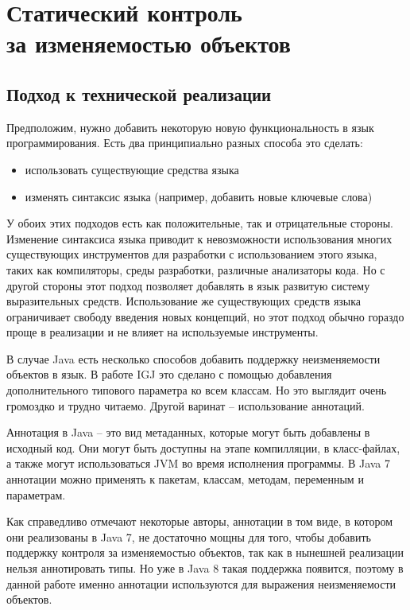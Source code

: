\chapter{Статический контроль \\ за изменяемостью объектов}

\section{Подход к технической реализации}

Предположим, нужно добавить некоторую новую функциональность в язык программирования. Есть два принципиально разных способа это сделать:
\begin{itemize}
	\item использовать существующие средства языка
	\item изменять синтаксис языка (например, добавить новые ключевые слова)
\end{itemize}

У обоих этих подходов есть как положительные, так и отрицательные стороны. Изменение синтаксиса языка приводит к невозможности использования многих существующих инструментов для разработки с использованием этого языка, таких как компиляторы, среды разработки, различные анализаторы кода. Но с другой стороны этот подход позволяет добавлять в язык развитую систему выразительных средств. Использование же существующих средств языка ограничивает свободу введения новых концепций, но этот подход обычно гораздо проще в реализации и не влияет на используемые инструменты.

В случае Java есть несколько способов добавить поддержку неизменяемости объектов в язык. В работе IGJ это сделано с помощью добавления дополнительного типового параметра ко всем классам. Но это выглядит очень громоздко и трудно читаемо. Другой варинат -- использование аннотаций. 

Аннотация в Java -- это вид метаданных, которые могут быть добавлены в исходный код. Они могут быть доступны на этапе компилляции, в класс-файлах, а также могут использоваться JVM во время исполнения программы. В Java 7 аннотации можно применять к пакетам, классам, методам, переменным и параметрам. 

Как справедливо отмечают некоторые авторы, аннотации в том виде, в котором они реализованы в Java 7, не достаточно мощны для того, чтобы добавить поддержку контроля за изменяемостью объектов, так как в нынешней реализации нельзя аннотировать типы. Но уже в Java 8 такая поддержка появится, поэтому в данной работе именно аннотации используются для выражения неизменяемости объектов.

